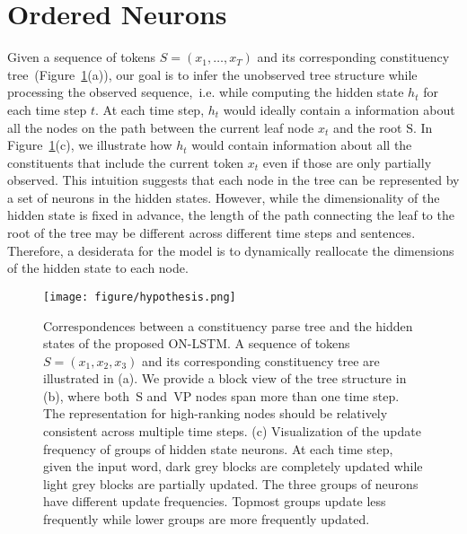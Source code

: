 \documentclass{article} \usepackage{iclr2019_conference,times}
\begin{document}
\section{Ordered Neurons}
Given a sequence of tokens $S = (x_1, \ldots, x_T)$ and its corresponding constituency tree~(Figure~\ref{fig:tree}(a)), our goal is to infer the unobserved tree structure while processing the observed sequence,~i.e. while computing the hidden state $h_t$ for each time step $t$.
At each time step, $h_t$ would ideally contain a information about all the nodes on the path between the current leaf node $x_t$ and the root $\mathrm{S}$. In Figure~\ref{fig:tree}(c), we illustrate how $h_t$ would contain information about all the constituents that include the current token $x_t$ even if those are only partially observed.
This intuition suggests that each node in the tree can be represented by a set of neurons in the hidden states. However, while the dimensionality of the hidden state is fixed in advance, the length of the path connecting the leaf to the root of the tree may be different across different time steps and sentences. Therefore, a desiderata for the model is to dynamically reallocate the dimensions of the hidden state to each node.
\begin{figure}[t]
\centering
\texttt{[image: figure/hypothesis.png]}
\caption{Correspondences between a constituency parse tree and the hidden states of the proposed ON-LSTM.
A sequence of tokens $S = (x_1, x_2, x_3)$ and its corresponding constituency tree are illustrated in (a).
We provide a block view of the tree structure in (b), where both~$\mathrm{S}$ and~$\mathrm{VP}$ nodes span more than one time step.
The representation for high-ranking nodes should be relatively consistent across multiple time steps.
(c) Visualization of the update frequency of groups of hidden state neurons. At each time step, given the input word, dark grey blocks are completely updated while light grey blocks are partially updated.
The three groups of neurons have different update frequencies. Topmost groups update less frequently while lower groups are more frequently updated.
}
\label{fig:tree}
\end{figure}
\end{document}
